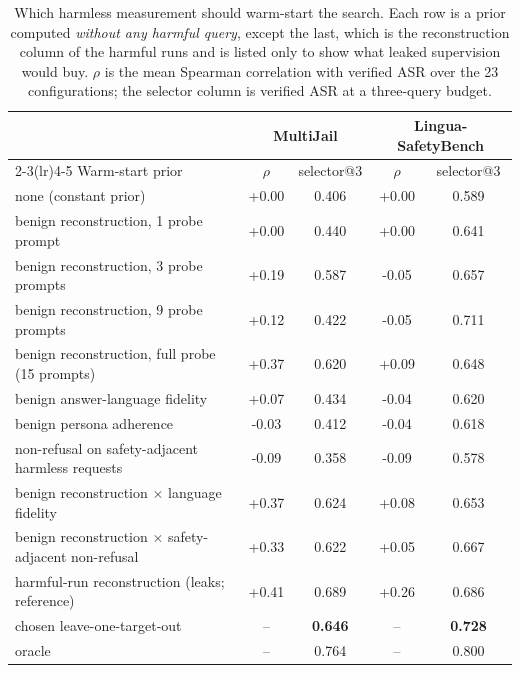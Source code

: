 \begin{table}[t]
\centering
\small
\caption{Which harmless measurement should warm-start the search. Each row is a prior computed \emph{without any harmful query}, except the last, which is the reconstruction column of the harmful runs and is listed only to show what leaked supervision would buy. $\rho$ is the mean Spearman correlation with verified ASR over the 23 configurations; the selector column is verified ASR at a three-query budget.}
\label{tab:sel_prior}
\begin{tabular}{lcccc}
\toprule
& \multicolumn{2}{c}{MultiJail} & \multicolumn{2}{c}{Lingua-SafetyBench} \\
\cmidrule(lr){2-3}\cmidrule(lr){4-5}
Warm-start prior & $\rho$ & selector@3 & $\rho$ & selector@3 \\
\midrule
none (constant prior) & +0.00 & 0.406 & +0.00 & 0.589 \\
benign reconstruction, 1 probe prompt & +0.00 & 0.440 & +0.00 & 0.641 \\
benign reconstruction, 3 probe prompts & +0.19 & 0.587 & -0.05 & 0.657 \\
benign reconstruction, 9 probe prompts & +0.12 & 0.422 & -0.05 & 0.711 \\
benign reconstruction, full probe (15 prompts) & +0.37 & 0.620 & +0.09 & 0.648 \\
benign answer-language fidelity & +0.07 & 0.434 & -0.04 & 0.620 \\
benign persona adherence & -0.03 & 0.412 & -0.04 & 0.618 \\
non-refusal on safety-adjacent harmless requests & -0.09 & 0.358 & -0.09 & 0.578 \\
benign reconstruction $\times$ language fidelity & +0.37 & 0.624 & +0.08 & 0.653 \\
benign reconstruction $\times$ safety-adjacent non-refusal & +0.33 & 0.622 & +0.05 & 0.667 \\
harmful-run reconstruction (leaks; reference) & +0.41 & 0.689 & +0.26 & 0.686 \\
\midrule
chosen leave-one-target-out & -- & \textbf{0.646} & -- & \textbf{0.728} \\
oracle & -- & 0.764 & -- & 0.800 \\
\bottomrule
\end{tabular}
\end{table}
